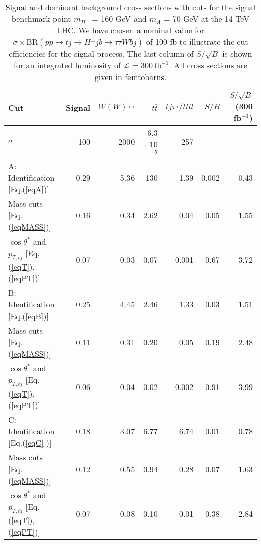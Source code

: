\begin{table}[h]
\centering
\strictpagecheck
\begin{adjustwidth*}{0in}{-2.1in}
  \begin{tabularx}{6in}{lrrrrrr}
    \toprule
    Cut & Signal & $W(W)\tau\tau$ & $t\bar{t}$ & $tj\tau\tau/ttll$ & $S/B$ & $S/\sqrt{B}$ (300 fb$^{-1}$) \\
\midrule
$\sigma$ 														&100 		&		 2000		& 6.3 $\cdot$ 10$^5$ 				& 257		&	-			&	-	\\
\midrule
A: Identification [Eq.(\ref{eqA})] & 0.29 & 5.36 & 130 & 1.39 & 0.002 & 0.43	\\
\phantom{A:} 
Mass cuts [Eq.(\ref{eqMASS})]											&0.16	 	&   0.34 		& 2.62				& 0.04		&	 0.05  	& 1.55	\\
\phantom{A:} $\cos\theta^*$ and $p_{T,tj}$ [Eq.(\ref{eqT}), (\ref{eqPT})]&0.07	 	&   0.03 		& 0.07					& 0.001		& 	 0.67  	& 3.72	\\
\hline
B: Identification [Eq.(\ref{eqB})]	 									&0.25	 	&   4.45 		& 2.46					& 1.33	&	 0.03 		& 1.51	\\
\phantom{B:} Mass cuts [Eq.(\ref{eqMASS})]								&0.11	 	&   0.31 		& 0.20					& 0.05	&	 0.19 		& 2.48	\\
\phantom{B:} $\cos\theta^*$ and $p_{T,tj}$ [Eq.(\ref{eqT}), (\ref{eqPT})]&0.06	 	&   0.04 		& 0.02					& 0.002		&	 0.91 		& 3.99	\\
\hline
C: Identification [Eq.(\ref{eqC} )]	 									&0.18	 	&   3.07 		& 6.77				& 6.74		& 	0.01  	& 0.78 \\
\phantom{C:} Mass cuts [Eq.(\ref{eqMASS})]								&0.12	 	&   0.55 		& 0.94				& 0.28		& 	0.07  	& 1.63 \\
\phantom{C:} $\cos\theta^*$ and $p_{T,tj}$ [Eq.(\ref{eqT}), (\ref{eqPT})]&0.07	 	&   0.08 		& 0.10					& 0.01		& 	0.38  	& 2.84 \\
\bottomrule
\end{tabularx}
\caption{Signal and dominant background cross sections with cuts for the signal benchmark point $m_{H^{\pm}}$ = 160 GeV and $m_A$ = 70 GeV at the 14 TeV LHC. We have chosen a nominal value for $\sigma \times \text{BR}(pp \rightarrow tj \rightarrow H^{\pm} j b \rightarrow \tau\tau W b j )$ of 100 fb to illustrate the cut efficiencies for the signal process. The last column of $S/\sqrt{B}$ is shown for an integrated luminosity of $\mathcal{L}=300\ \text{fb}^{-1}$. All cross sections are given in femtobarns.}
\label{tab:tj}
\end{adjustwidth*}
\end{table}

